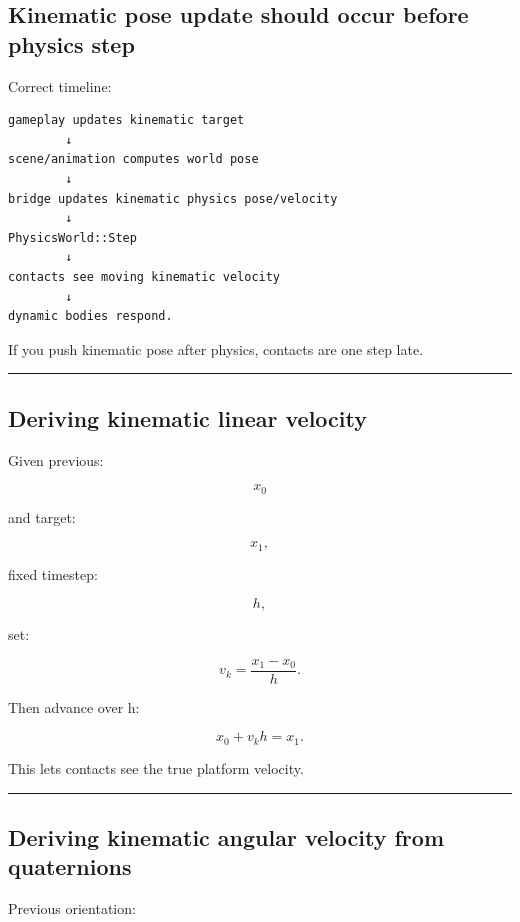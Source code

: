 \subsection{Kinematic pose update should occur before physics step}\label{06-engine-ii-ch037-kinematic-pose-update-should-occur-before-physics-step}

Correct timeline:

\begin{verbatim}
gameplay updates kinematic target
        ↓
scene/animation computes world pose
        ↓
bridge updates kinematic physics pose/velocity
        ↓
PhysicsWorld::Step
        ↓
contacts see moving kinematic velocity
        ↓
dynamic bodies respond.
\end{verbatim}

If you push kinematic pose after physics, contacts are one step late.

\begin{center}\rule{0.5\linewidth}{0.5pt}\end{center}

\subsection{Deriving kinematic linear velocity}\label{06-engine-ii-ch037-deriving-kinematic-linear-velocity}

Given previous:

\[
x_0
\]

and target:

\[
x_1,
\]

fixed timestep:

\[
h,
\]

set:

\[
\boxed{
v_k
=
\frac{x_1-x_0}{h}.
}
\]

Then advance over h:

\[
x_0+v_kh=x_1.
\]

This lets contacts see the true platform velocity.

\begin{center}\rule{0.5\linewidth}{0.5pt}\end{center}

\subsection{Deriving kinematic angular velocity from quaternions}\label{06-engine-ii-ch037-deriving-kinematic-angular-velocity-from-quaternions}

Previous orientation:

